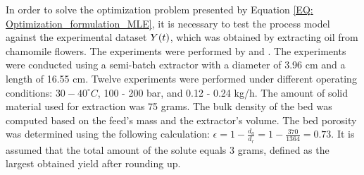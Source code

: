 \documentclass[../Article_Model_Parameters.tex]{subfiles}
\begin{document}
	
	\label{CH: Experiments}
	
	
	
	In order to solve the optimization problem presented by Equation \ref{EQ: Optimization_formulation_MLE}, it is necessary to test the process model against the experimental dataset ${\color{black}Y}(t)$, which was obtained by extracting oil from chamomile flowers. The experiments were performed by \citet{Povh2001} and \citet{Rahimi2011}. The experiments were conducted using a semi-batch extractor with a diameter of 3.96 cm and a length of 16.55 cm. Twelve experiments were performed under different operating conditions: $30-40^\circ C$, 100 - 200 bar, and 0.12 - 0.24 kg/h. The amount of solid material used for extraction was 75 grams. The bulk density of the bed was computed based on the feed's mass and the extractor's volume. The bed porosity was determined using the following calculation: $\epsilon=1-\frac{d_a}{d_r} = 1-\frac{370}{1364} = 0.73$. It is assumed that the total amount of the solute equals 3 grams, defined as the largest obtained yield after rounding up.
	
\end{document}
